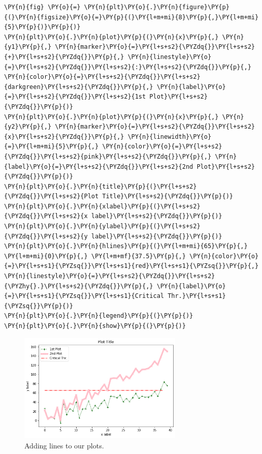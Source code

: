 \begin{tcolorbox}[breakable, size=fbox, boxrule=1pt, pad at break*=1mm,colback=cellbackground, colframe=cellborder]
\begin{Verbatim}[commandchars=\\\{\}]
\PY{n}{fig} \PY{o}{=} \PY{n}{plt}\PY{o}{.}\PY{n}{figure}\PY{p}{(}\PY{n}{figsize}\PY{o}{=}\PY{p}{(}\PY{l+m+mi}{8}\PY{p}{,}\PY{l+m+mi}{5}\PY{p}{)}\PY{p}{)}
\PY{n}{plt}\PY{o}{.}\PY{n}{plot}\PY{p}{(}\PY{n}{x}\PY{p}{,} \PY{n}{y1}\PY{p}{,} \PY{n}{marker}\PY{o}{=}\PY{l+s+s2}{\PYZdq{}}\PY{l+s+s2}{+}\PY{l+s+s2}{\PYZdq{}}\PY{p}{,} \PY{n}{linestyle}\PY{o}{=}\PY{l+s+s2}{\PYZdq{}}\PY{l+s+s2}{:}\PY{l+s+s2}{\PYZdq{}}\PY{p}{,} \PY{n}{color}\PY{o}{=}\PY{l+s+s2}{\PYZdq{}}\PY{l+s+s2}{darkgreen}\PY{l+s+s2}{\PYZdq{}}\PY{p}{,} \PY{n}{label}\PY{o}{=}\PY{l+s+s2}{\PYZdq{}}\PY{l+s+s2}{1st Plot}\PY{l+s+s2}{\PYZdq{}}\PY{p}{)}
\PY{n}{plt}\PY{o}{.}\PY{n}{plot}\PY{p}{(}\PY{n}{x}\PY{p}{,} \PY{n}{y2}\PY{p}{,} \PY{n}{marker}\PY{o}{=}\PY{l+s+s2}{\PYZdq{}}\PY{l+s+s2}{x}\PY{l+s+s2}{\PYZdq{}}\PY{p}{,} \PY{n}{linewidth}\PY{o}{=}\PY{l+m+mi}{5}\PY{p}{,} \PY{n}{color}\PY{o}{=}\PY{l+s+s2}{\PYZdq{}}\PY{l+s+s2}{pink}\PY{l+s+s2}{\PYZdq{}}\PY{p}{,} \PY{n}{label}\PY{o}{=}\PY{l+s+s2}{\PYZdq{}}\PY{l+s+s2}{2nd Plot}\PY{l+s+s2}{\PYZdq{}}\PY{p}{)}
\PY{n}{plt}\PY{o}{.}\PY{n}{title}\PY{p}{(}\PY{l+s+s2}{\PYZdq{}}\PY{l+s+s2}{Plot Title}\PY{l+s+s2}{\PYZdq{}}\PY{p}{)}
\PY{n}{plt}\PY{o}{.}\PY{n}{xlabel}\PY{p}{(}\PY{l+s+s2}{\PYZdq{}}\PY{l+s+s2}{x label}\PY{l+s+s2}{\PYZdq{}}\PY{p}{)}
\PY{n}{plt}\PY{o}{.}\PY{n}{ylabel}\PY{p}{(}\PY{l+s+s2}{\PYZdq{}}\PY{l+s+s2}{y label}\PY{l+s+s2}{\PYZdq{}}\PY{p}{)}
\PY{n}{plt}\PY{o}{.}\PY{n}{hlines}\PY{p}{(}\PY{l+m+mi}{65}\PY{p}{,} \PY{l+m+mi}{0}\PY{p}{,} \PY{l+m+mf}{37.5}\PY{p}{,} \PY{n}{color}\PY{o}{=}\PY{l+s+s1}{\PYZsq{}}\PY{l+s+s1}{red}\PY{l+s+s1}{\PYZsq{}}\PY{p}{,} \PY{n}{linestyle}\PY{o}{=}\PY{l+s+s2}{\PYZdq{}}\PY{l+s+s2}{\PYZhy{}.}\PY{l+s+s2}{\PYZdq{}}\PY{p}{,} \PY{n}{label}\PY{o}{=}\PY{l+s+s1}{\PYZsq{}}\PY{l+s+s1}{Critical Thr.}\PY{l+s+s1}{\PYZsq{}}\PY{p}{)}
\PY{n}{plt}\PY{o}{.}\PY{n}{legend}\PY{p}{(}\PY{p}{)}
\PY{n}{plt}\PY{o}{.}\PY{n}{show}\PY{p}{(}\PY{p}{)}
\end{Verbatim}
\end{tcolorbox}

\begin{figure}[htb]
	\centering
	\includegraphics[width=0.7\textwidth]{figures/lines}
	\caption{Adding lines to our plots.}
	\label{fig:lines}
\end{figure}

